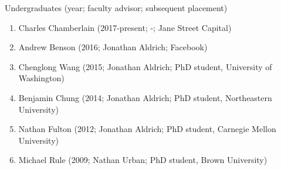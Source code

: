 \documentclass[10pt,letterpaper]{article}
\renewenvironment{itemize}{
  \begin{list}{}{
    \setlength{\leftmargin}{1.25em}
    \setlength{\itemsep}{0.25em}
    \setlength{\parskip}{0pt}
    \setlength{\parsep}{0.2em}
  }
}{
  \end{list}
}
\begin{document}
\begin{itemize}
\item Undergraduates (year; faculty advisor; subsequent placement)
  \begin{enumerate}
  \item Charles Chamberlain (2017-present; -; Jane Street Capital)
  \item Andrew Benson (2016; Jonathan Aldrich; Facebook)
  \item Chenglong Wang (2015; Jonathan Aldrich; PhD student, University of Washington)
  \item Benjamin Chung (2014; Jonathan Aldrich; PhD student, Northeastern University)
  \item Nathan Fulton (2012; Jonathan Aldrich; PhD student, Carnegie Mellon University)
  \item Michael Rule (2009; Nathan Urban; PhD student, Brown University)
  \end{enumerate}
\end{itemize}
\end{document}
